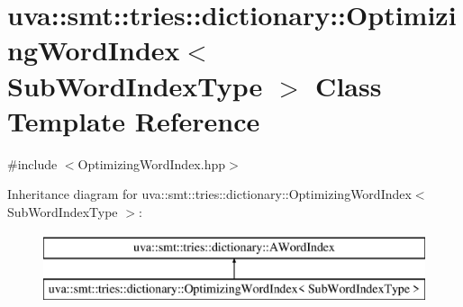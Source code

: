 \hypertarget{classuva_1_1smt_1_1tries_1_1dictionary_1_1_optimizing_word_index}{}\section{uva\+:\+:smt\+:\+:tries\+:\+:dictionary\+:\+:Optimizing\+Word\+Index$<$ Sub\+Word\+Index\+Type $>$ Class Template Reference}
\label{classuva_1_1smt_1_1tries_1_1dictionary_1_1_optimizing_word_index}


{\ttfamily \#include $<$Optimizing\+Word\+Index.\+hpp$>$}

Inheritance diagram for uva\+:\+:smt\+:\+:tries\+:\+:dictionary\+:\+:Optimizing\+Word\+Index$<$ Sub\+Word\+Index\+Type $>$\+:\begin{figure}[H]
\begin{center}
\leavevmode
\includegraphics[height=2.000000cm]{classuva_1_1smt_1_1tries_1_1dictionary_1_1_optimizing_word_index}
\end{center}
\end{figure}
